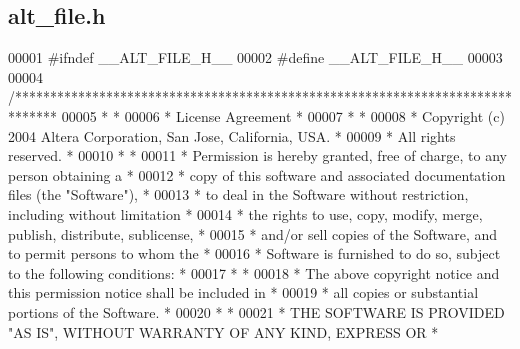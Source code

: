 \subsection{alt\+\_\+file.\+h}
\label{alt__file_8h_source}

\begin{DoxyCode}
00001 \textcolor{preprocessor}{#ifndef \_\_ALT\_FILE\_H\_\_}
00002 \textcolor{preprocessor}{#define \_\_ALT\_FILE\_H\_\_}
00003 
00004 \textcolor{comment}{/******************************************************************************}
00005 \textcolor{comment}{*                                                                             *}
00006 \textcolor{comment}{* License Agreement                                                           *}
00007 \textcolor{comment}{*                                                                             *}
00008 \textcolor{comment}{* Copyright (c) 2004 Altera Corporation, San Jose, California, USA.           *}
00009 \textcolor{comment}{* All rights reserved.                                                        *}
00010 \textcolor{comment}{*                                                                             *}
00011 \textcolor{comment}{* Permission is hereby granted, free of charge, to any person obtaining a     *}
00012 \textcolor{comment}{* copy of this software and associated documentation files (the "Software"),  *}
00013 \textcolor{comment}{* to deal in the Software without restriction, including without limitation   *}
00014 \textcolor{comment}{* the rights to use, copy, modify, merge, publish, distribute, sublicense,    *}
00015 \textcolor{comment}{* and/or sell copies of the Software, and to permit persons to whom the       *}
00016 \textcolor{comment}{* Software is furnished to do so, subject to the following conditions:        *}
00017 \textcolor{comment}{*                                                                             *}
00018 \textcolor{comment}{* The above copyright notice and this permission notice shall be included in  *}
00019 \textcolor{comment}{* all copies or substantial portions of the Software.                         *}
00020 \textcolor{comment}{*                                                                             *}
00021 \textcolor{comment}{* THE SOFTWARE IS PROVIDED "AS IS", WITHOUT WARRANTY OF ANY KIND, EXPRESS OR  *}

\end{DoxyCode}
